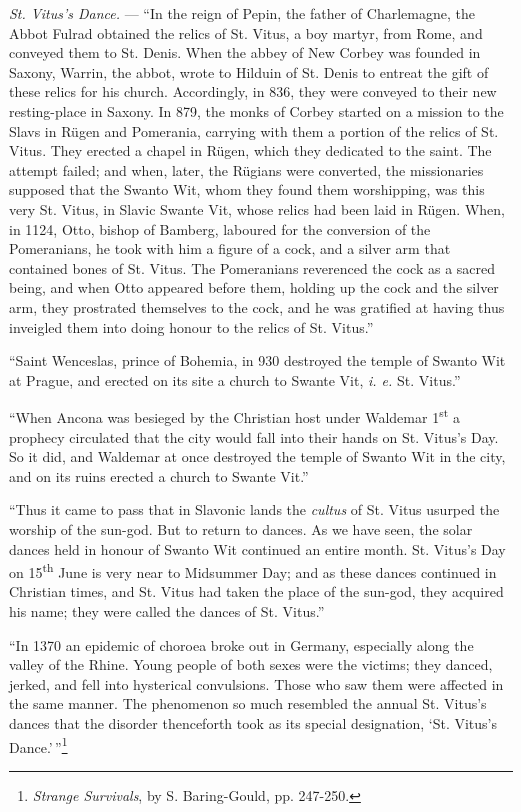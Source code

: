 \documentclass[a4paper, 11pt, oneside, polutonikogreek, english]{article}
\begin{document}
\emph{St. Vitus's Dance.} --- ``In the reign of Pepin, the father of Charlemagne, the Abbot Fulrad obtained the relics of St. Vitus, a boy martyr, from Rome, and conveyed them to St. Denis. When the abbey of New Corbey was founded in Saxony, Warrin, the abbot, wrote to Hilduin of St. Denis to entreat the gift of these relics for his church. Accordingly, in 836, they were conveyed to their new resting-place in Saxony. In 879, the monks of Corbey started on a mission to the Slavs in Rügen and Pomerania, carrying with them a portion of the relics of St. Vitus. They erected a chapel in Rügen, which they dedicated to the saint. The attempt failed; and when, later, the Rügians were converted, the missionaries supposed that the Swanto Wit, whom they found them worshipping, was this very St. Vitus, in Slavic Swante Vit, whose relics had been laid in Rügen. When, in 1124, Otto, bishop of Bamberg, laboured for the conversion of the Pomeranians, he took with him a figure of a cock, and a silver arm that contained bones of St. Vitus. The Pomeranians reverenced the cock as a sacred being, and when Otto appeared before them, holding up the cock and the silver arm, they prostrated themselves to the cock, and he was gratified at having thus inveigled them into doing honour to the relics of St. Vitus.''

``Saint Wenceslas, prince of Bohemia, in 930 destroyed the temple of Swanto Wit at Prague, and erected on its site a church to Swante Vit, \emph{i. e.} St. Vitus.''

``When Ancona was besieged by the Christian host under Waldemar 1\textsuperscript{st} a prophecy circulated that the city would fall into their hands on St. Vitus's Day. So it did, and Waldemar at once destroyed the temple of Swanto Wit in the city, and on its ruins erected a church to Swante Vit.''

``Thus it came to pass that in Slavonic lands the \emph{cultus} of St. Vitus usurped the worship of the sun-god. But to return to dances. As we have seen, the solar dances held in honour of Swanto Wit continued an entire month. St. Vitus's Day on 15\textsuperscript{th} June is very near to Midsummer Day; and as these dances continued in Christian times, and St. Vitus had taken the place of the sun-god, they acquired his name; they were called the dances of St. Vitus.''

``In 1370 an epidemic of choroea broke out in Germany, especially along the valley of the Rhine. Young people of both sexes were the victims; they danced, jerked, and fell into hysterical convulsions. Those who saw them were affected in the same manner. The phenomenon so much resembled the annual St. Vitus's dances that the disorder thenceforth took as its special designation, `St. Vitus's Dance.'\,''\footnote{\emph{Strange Survivals}, by S. Baring-Gould, pp. 247-250.}
\end{document}
